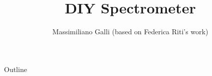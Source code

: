 \documentclass[9pt, xcolor=dvipsnames]{beamer}
\title[DIY Spectrometer]{DIY Spectrometer}
\author[]{Massimiliano Galli (based on Federica Riti's work)}
\institute[]{\normalsize{ETH Z\"urich}}
\begin{document}
\begin{frame}
  \vspace{0.5cm}
  \titlepage
\end{frame}


\begin{frame}{Outline}
  \fontsize{9pts}{12}\selectfont
  \tableofcontents
\end{frame}



\end{document}
